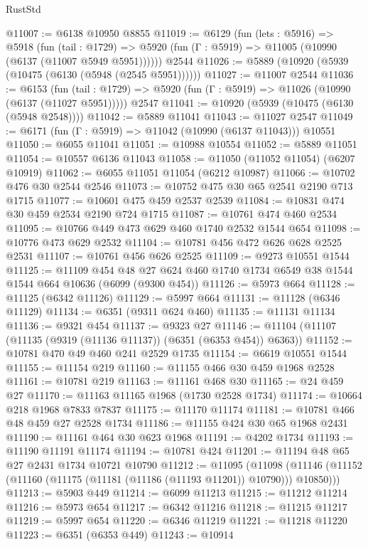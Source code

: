 \begin{lexlean}{RustStd}
\begin{coremodule}
@11007 := @6138 @10950 @8855
@11019 := @6129
    (fun (lets : @5916) =>
    @5918
      (fun (tail : @1729) =>
      @5920 (fun (Γ : @5919) => @11005 (@10990 (@6137 (@11007 @5949 @5951))))))
    @2544
@11026 := @5889 (@10920 (@5939 (@10475 (@6130 (@5948 (@2545 @5951))))))
@11027 := @11007 @2544
@11036 := @6153
    (fun (tail : @1729) => @5920 (fun (Γ : @5919) => @11026 (@10990 (@6137 (@11027 @5951)))))
    @2547
@11041 := @10920 (@5939 (@10475 (@6130 (@5948 @2548))))
@11042 := @5889 @11041
@11043 := @11027 @2547
@11049 := @6171 (fun (Γ : @5919) => @11042 (@10990 (@6137 @11043))) @10551
@11050 := @6055 @11041
@11051 := @10988 @10554
@11052 := @5889 @11051
@11054 := @10557 @6136 @11043
@11058 := @11050 (@11052 @11054) (@6207 @10919)
@11062 := @6055 @11051 @11054 (@6212 @10987)
@11066 := @10702 @476 @30 @2544 @2546
@11073 := @10752 @475 @30 @65 @2541 @2190 @713 @1715
@11077 := @10601 @475 @459 @2537 @2539
@11084 := @10831 @474 @30 @459 @2534 @2190 @724 @1715
@11087 := @10761 @474 @460 @2534
@11095 := @10766 @449 @473 @629 @460 @1740 @2532 @1544 @654
@11098 := @10776 @473 @629 @2532
@11104 := @10781 @456 @472 @626 @628 @2525 @2531
@11107 := @10761 @456 @626 @2525
@11109 := @9273 @10551 @1544
@11125 := @11109
    @454
    @48
    @27
    @624
    @460
    @1740
    @1734
    @6549
    @38
    @1544
    @1544
    @664
    @10636
    (@6099 (@9300 @454))
@11126 := @5973 @664
@11128 := @11125 (@6342 @11126)
@11129 := @5997 @664
@11131 := @11128 (@6346 @11129)
@11134 := @6351 (@9311 @624 @460)
@11135 := @11131 @11134
@11136 := @9321 @454
@11137 := @9323 @27
@11146 := @11104 (@11107 (@11135 (@9319 (@11136 @11137)) (@6351 (@6353 @454)) @6363))
@11152 := @10781 @470 @49 @460 @241 @2529 @1735
@11154 := @6619 @10551 @1544
@11155 := @11154 @219
@11160 := @11155 @466 @30 @459 @1968 @2528
@11161 := @10781 @219
@11163 := @11161 @468 @30
@11165 := @24 @459 @27
@11170 := @11163 @11165 @1968 (@1730 @2528 @1734)
@11174 := @10664 @218 @1968 @7833 @7837
@11175 := @11170 @11174
@11181 := @10781 @466 @48 @459 @27 @2528 @1734
@11186 := @11155 @424 @30 @65 @1968 @2431
@11190 := @11161 @464 @30 @623 @1968
@11191 := @4202 @1734
@11193 := @11190 @11191 @11174
@11194 := @10781 @424
@11201 := @11194 @48 @65 @27 @2431 @1734 @10721 @10790
@11212 := @11095
    (@11098 (@11146 (@11152 (@11160 (@11175 (@11181 (@11186 (@11193 @11201)) @10790))) @10850)))
@11213 := @5903 @449
@11214 := @6099 @11213
@11215 := @11212 @11214
@11216 := @5973 @654
@11217 := @6342 @11216
@11218 := @11215 @11217
@11219 := @5997 @654
@11220 := @6346 @11219
@11221 := @11218 @11220
@11223 := @6351 (@6353 @449)
@11243 := @10914

\end{coremodule}
\end{lexlean}
